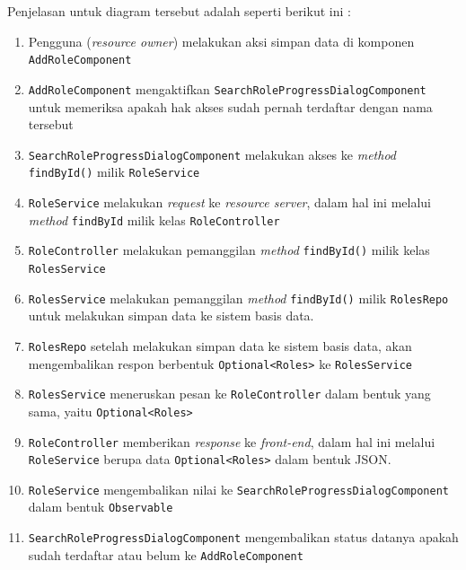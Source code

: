 \documentclass[pdftex,12pt, oneside]{article}
\begin{document}
\begin{itemize}
	Penjelasan untuk diagram tersebut adalah seperti berikut ini :
	
	\begin{enumerate}
		\item Pengguna (\textit{resource owner}) melakukan aksi simpan data di komponen \texttt{AddRoleComponent}
		
		\item \texttt{AddRoleComponent} mengaktifkan \texttt{SearchRoleProgressDialogComponent} untuk memeriksa apakah hak akses sudah pernah terdaftar dengan nama tersebut 
		
		\item \texttt{SearchRoleProgressDialogComponent} melakukan akses ke \textit{method} \texttt{findById()} milik \texttt{RoleService}
		
		\item \texttt{RoleService} melakukan \textit{request} ke \textit{resource server}, dalam hal ini melalui \textit{method} \texttt{findById} milik kelas \texttt{RoleController}
		
		\item \texttt{RoleController} melakukan pemanggilan \textit{method} \texttt{findById()} milik kelas \texttt{RolesService}
		
		\item \texttt{RolesService} melakukan pemanggilan \textit{method} \texttt{findById()} milik \texttt{RolesRepo} untuk melakukan simpan data ke sistem basis data.
		
		\item \texttt{RolesRepo} setelah melakukan simpan data ke sistem basis data, akan mengembalikan respon berbentuk \texttt{Optional<Roles>} ke \texttt{RolesService}
		
		\item \texttt{RolesService} meneruskan pesan ke \texttt{RoleController} dalam bentuk yang sama, yaitu \texttt{Optional<Roles>}
		
		\item \texttt{RoleController} memberikan \textit{response} ke \textit{front-end}, dalam hal ini melalui \texttt{RoleService} berupa data \texttt{Optional<Roles>} dalam bentuk JSON.
		
		\item \texttt{RoleService} mengembalikan nilai ke \texttt{SearchRoleProgressDialogComponent} dalam bentuk \texttt{Observable}
		
		\item \texttt{SearchRoleProgressDialogComponent} mengembalikan status datanya apakah sudah terdaftar atau belum ke \texttt{AddRoleComponent}
		

\end{enumerate}
\end{itemize}
\end{document}

